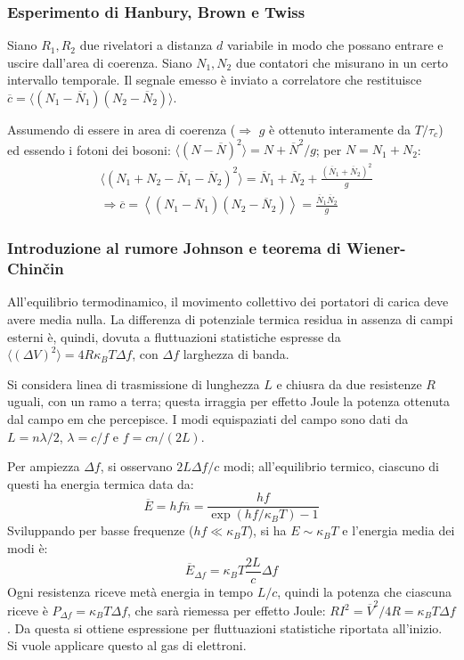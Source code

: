\documentclass[10pt, a4paper]{scrartcl}
\numberwithin{equation}{subsection}
\theoremstyle{style1}
\begin{document}
\subsubsection{Esperimento di Hanbury, Brown e Twiss}
Siano $R_{1},R_2$ due rivelatori a distanza $d$ variabile in modo che possano entrare e uscire dall'area di coerenza.
Siano $N_1,N_2$ due contatori che misurano in un certo intervallo temporale.
Il segnale emesso \`e inviato a correlatore che restituisce $\overline{c} = \langle (N_1-\overline{N}_1)(N_2-\overline{N}_2) \rangle$.

Assumendo di essere in area di coerenza ($\Rightarrow $ $g$ \`e ottenuto interamente da $T / \tau _c$) ed essendo i fotoni dei bosoni: $\langle (N - \overline{N})^2 \rangle= N + \overline{N}^2 / g$; per $N = N_1+N_2$:
\[
\begin{split}
	&\big\langle (N_1+N_2 - \overline{N}_1 - \overline{N}_2)^2 \big\rangle = \overline{N}_1 + \overline{N}_2 + \frac{(\overline{N}_1 + \overline{N}_2)^2}{g}\\
	&\Rightarrow \overline{c} = \left\langle (N_1-\overline{N}_1) (N_2 - \overline{N}_2) \right\rangle = \frac{\overline{N}_1 \overline{N}_2}{g}
\end{split}
\] 
\subsubsection{Introduzione al rumore Johnson e teorema di Wiener-Chin\v cin}

All'equilibrio termodinamico, il movimento collettivo dei portatori di carica deve avere media nulla.
La differenza di potenziale termica residua in assenza di campi esterni \`e, quindi, dovuta a fluttuazioni statistiche espresse da $\langle (\Delta V)^2 \rangle = 4 R \kappa _B T \Delta f$, con $\Delta f$ larghezza di banda.

Si considera linea di trasmissione di lunghezza $L$ e chiusra da due resistenze $R $ uguali, con un ramo a terra; 
questa irraggia per effetto Joule la potenza ottenuta dal campo em che percepisce. 
I modi equispaziati del campo sono dati da $L = n \lambda  / 2$, $\lambda  = c / f$ e $f = c n / (2L)$.

Per ampiezza $\Delta f$, si osservano $2L \Delta f / c$ modi; all'equilibrio termico, ciascuno di questi ha energia termica data da:
\begin{equation}
	\overline{E} = h f \overline{n}= \frac{hf}{\exp(hf / \kappa _B T) -1 }
\end{equation}
Sviluppando per basse frequenze ($hf \ll\kappa _B T$), si ha $E \sim \kappa _B T$ e l'energia media dei modi \`e:
\begin{equation}
	\overline{E}_{\Delta f}  = \kappa _B T \frac{2L}{c}\Delta f
\end{equation}
Ogni resistenza riceve met\`a energia in tempo $L / c$, quindi la potenza che ciascuna riceve \`e $P_{\Delta f} = \kappa _B T \Delta f$,
che sar\`a riemessa per effetto Joule: $RI^2 = \overline{V}^2 / 4R = \kappa _B T \Delta f$. 
Da questa si ottiene espressione per fluttuazioni statistiche riportata all'inizio.	
Si vuole applicare questo al gas di elettroni.
\end{document}
